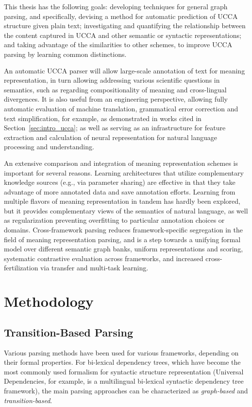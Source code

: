 \documentclass[12pt,a4paper,table]{report}
\begin{document}
This thesis has the following goals:
developing techniques for general graph parsing, and
specifically, devising a method for automatic prediction of UCCA
    structure given plain text;
investigating and quantifying the relationship between the content
    captured in UCCA and other semantic or syntactic representations;
and taking advantage of the similarities to other schemes,
    to improve UCCA parsing by learning common distinctions.

An automatic UCCA parser will allow large-scale annotation of text for meaning representation, in turn allowing addressing various scientific questions in semantics, such as regarding compositionality of meaning and cross-lingual divergences. It is also useful from an engineering perspective, allowing fully automatic evaluation of machine translation, grammatical error correction and text simplification, for example, as demonstrated in works cited in Section~\ref{sec:intro_ucca}; as well as serving as an infrastructure for feature extraction and calculation of neural representation for natural language processing and understanding.

An extensive comparison and integration of meaning representation schemes is important for several reasons. Learning architectures that utilize complementary knowledge sources (e.g., via parameter sharing) are effective in that they take advantage of more annotated data and save annotation efforts. Learning from multiple flavors of meaning representation in tandem has hardly been explored, but it provides complementary views of the semantics of natural language, as well as regularization preventing overfitting to particular annotation choices or domains. Cross-framework parsing reduces framework-specific segregation in the field of meaning representation parsing, and is a step towards a unifying formal model over different semantic graph banks, uniform representations and scoring, systematic contrastive evaluation across frameworks, and increased cross-fertilization via transfer and multi-task learning.

\chapter{Methodology}

\section{Transition-Based Parsing}

Various parsing methods have been used for various frameworks,
depending on their formal properties.
For bi-lexical dependency trees, which have become the most commonly used
formalism for syntactic structure representation
(Universal Dependencies, for example, is a multilingual bi-lexical
syntactic dependency tree framework), the main parsing approaches can be
characterized as \textit{graph-based} and \textit{transition-based}.
\end{document}
